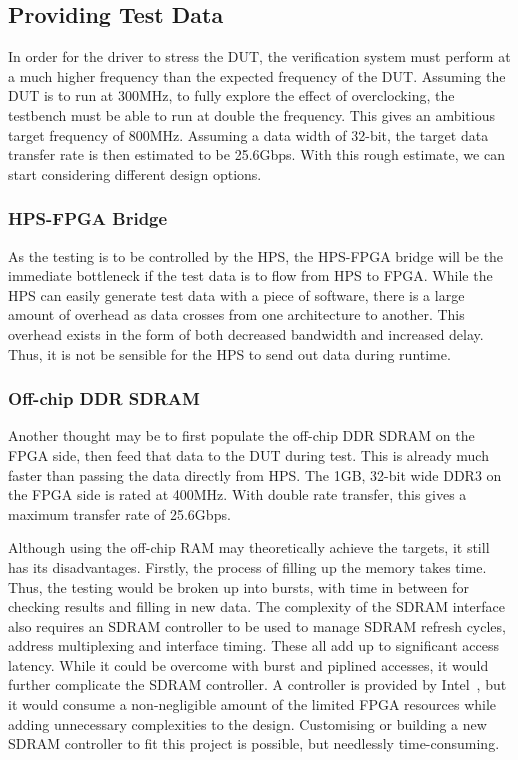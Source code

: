 \subsection{Providing Test Data}
In order for the driver to stress the DUT, the verification system must perform at a much higher frequency than the expected frequency of the DUT.
Assuming the DUT is to run at 300MHz, to fully explore the effect of overclocking, the testbench must be able to run at double the frequency.
This gives an ambitious target frequency of 800MHz.
Assuming a data width of 32-bit, the target data transfer rate is then estimated to be 25.6Gbps.
With this rough estimate, we can start considering different design options.

\subsubsection{HPS-FPGA Bridge}
As the testing is to be controlled by the HPS, the HPS-FPGA bridge will be the immediate bottleneck if the test data is to flow from HPS to FPGA.
While the HPS can easily generate test data with a piece of software, there is a large amount of overhead as data crosses from one architecture to another.
This overhead exists in the form of both decreased bandwidth and increased delay.
Thus, it is not be sensible for the HPS to send out data during runtime.

\subsubsection{Off-chip DDR SDRAM}
Another thought may be to first populate the off-chip DDR SDRAM on the FPGA side, then feed that data to the DUT during test.
This is already much faster than passing the data directly from HPS.
The 1GB, 32-bit wide DDR3 on the FPGA side is rated at 400MHz.
With double rate transfer, this gives a maximum transfer rate of 25.6Gbps.

Although using the off-chip RAM may theoretically achieve the targets, it still has its disadvantages.
Firstly, the process of filling up the memory takes time.
Thus, the testing would be broken up into bursts, with time in between for checking results and filling in new data.
The complexity of the SDRAM interface also requires an SDRAM controller to be used to manage SDRAM refresh cycles, address multiplexing and interface timing.
These all add up to significant access latency.
While it could be overcome with burst and piplined accesses, it would further complicate the SDRAM controller.
A controller is provided by Intel~\cite{Altera3}, but it would consume a non-negligible amount of the limited FPGA resources while adding unnecessary complexities to the design.
Customising or building a new SDRAM controller to fit this project is possible, but needlessly time-consuming.

